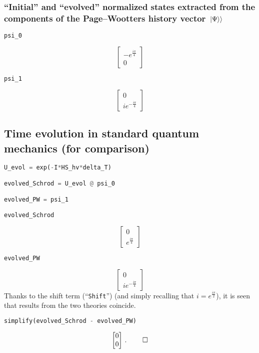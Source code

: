 \pagebreak\subsubsection*{``Initial'' and ``evolved'' normalized states extracted from the components of the Page--Wootters history vector $\left.\left| \Psi \right\rangle\right\rangle$}

\begin{lstlisting}[language=Python]
psi_0
\end{lstlisting}
$$
  \left[\begin{matrix}- e^{\frac{i \pi}{4}}\\0\end{matrix}\right]
$$
\begin{lstlisting}[language=Python]
psi_1
\end{lstlisting}
$$
  \left[\begin{matrix}0\\i e^{- \frac{i \pi}{4}}\end{matrix}\right]
$$

\subsection*{Time evolution in standard quantum mechanics (for comparison)}

\begin{lstlisting}[language=Python]
U_evol = exp(-I*HS_hv*delta_T)

evolved_Schrod = U_evol @ psi_0

evolved_PW = psi_1

evolved_Schrod
\end{lstlisting}
$$
  \left[\begin{matrix}0\\e^{\frac{i \pi}{4}}\end{matrix}\right]
$$
\begin{lstlisting}[language=Python]
evolved_PW
\end{lstlisting}
$$
  \left[\begin{matrix}0\\i e^{- \frac{i \pi}{4}}\end{matrix}\right]
$$
Thanks to the shift term (``\verb|Shift|'')
(and simply recalling that $i=e^{\frac{i\pi}{2}}$),
it is seen that
results from the two theories coincide.
\begin{lstlisting}[language=Python]
simplify(evolved_Schrod - evolved_PW)
\end{lstlisting}
$$
  \left[\begin{matrix}0\\0\end{matrix}\right] \, \text{.} \; \qed
$$